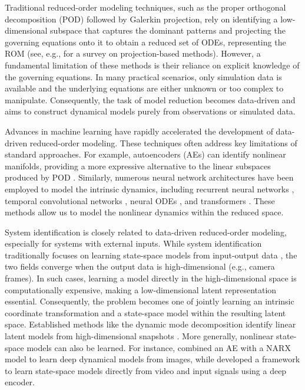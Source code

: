 \documentclass{article}
\begin{document}
Traditional reduced-order modeling techniques, such as the proper orthogonal decomposition (POD) followed by Galerkin projection, rely on identifying a low-dimensional subspace that captures the dominant patterns and projecting the governing equations onto it to obtain a reduced set of ODEs, representing the ROM (see, e.g., \cite{benner2015survey} for a survey on projection-based methods).
However, a fundamental limitation of these methods is their reliance on explicit knowledge of the governing equations.
In many practical scenarios, only simulation data is available and the underlying equations are either unknown or too complex to manipulate.
Consequently, the task of model reduction becomes data-driven and aims to construct dynamical models purely from observations or simulated data.

Advances in machine learning have rapidly accelerated the development of data-driven reduced-order modeling.
These techniques often address key limitations of standard approaches.
For example, autoencoders (AEs) can identify nonlinear manifolds, providing a more expressive alternative to the linear subspaces produced by POD \citep{lee2020model}.
Similarly, numerous neural network architectures have been employed to model the intrinsic dynamics, including recurrent neural networks \citep{maulik2021reduced, hasegawa2020cnn}, temporal convolutional networks \citep{xia2023hierarchical, wu2020data}, neural ODEs \citep{mjalled2024improved, linot2022data}, and transformers \citep{solera2024beta, hemmasian2023reduced}.
These methods allow us to model the nonlinear dynamics within the reduced space.

System identification is closely related to data-driven reduced-order modeling, especially for systems with external inputs.
While system identification traditionally focuses on learning state-space models from input-output data \citep{masti2021learning}, the two fields converge when the output data is high-dimensional (e.g., camera frames). 
In such cases, learning a model directly in the high-dimensional space is computationally expensive, making a low-dimensional latent representation essential.
Consequently, the problem becomes one of jointly learning an intrinsic coordinate transformation and a state-space model within the resulting latent space.
Established methods like the dynamic mode decomposition identify linear latent models from high-dimensional snapshots \citep{proctor2016dynamic}.
More generally, nonlinear state-space models can also be learned.
For instance, \cite{wahlstrom2015learning} combined an AE with a NARX model to learn deep dynamical models from images, while \cite{beintema2021non} developed a framework to learn state-space models directly from video and input signals using a deep encoder.
\end{document}
